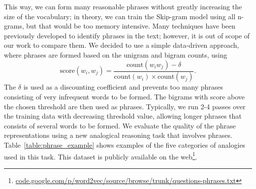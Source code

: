 \documentclass{article}
\begin{document}
This way, we can form many reasonable phrases without greatly increasing the size
of the vocabulary; in theory, we can train the Skip-gram model
using all n-grams, but that would
be too memory intensive. Many techniques have been previously developed
to identify phrases in the text;
however, it is out of scope of our work to compare them. We decided to use
a simple data-driven approach, where phrases are formed
based on the unigram and bigram counts, using
\begin{equation}
\textrm{score}(w_i, w_j) = \frac{\textrm{count}(w_iw_j) - \delta}{\textrm{count}(w_i)\times \textrm{count}(w_j)}.
\end{equation}
The $\delta$ is used as a discounting coefficient and prevents too many
phrases consisting of very infrequent words to be formed.
The bigrams with score above the chosen threshold are then used as phrases.
Typically, we run 2-4 passes over the training data with decreasing
threshold value, allowing longer phrases that consists of several words to be formed.
We evaluate the quality of the phrase representations using a new analogical
reasoning task that involves phrases. Table~\ref{table:phrase_example} shows
examples of the five categories of analogies used in this task. This dataset is publicly available
on the web\footnote{\url{code.google.com/p/word2vec/source/browse/trunk/questions-phrases.txt}}.
\end{document}
